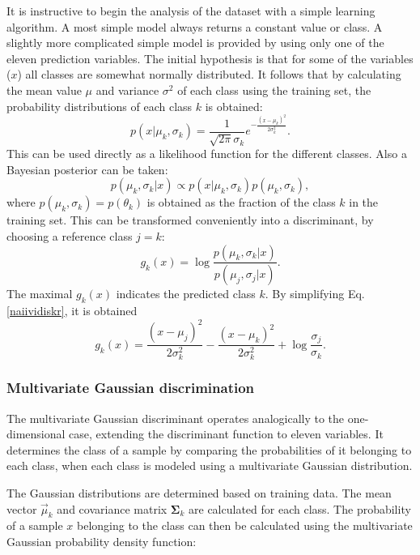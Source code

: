 \documentclass[twoside]{article}
\renewcommand{\v}[1]{\vec{#1}}
\begin{document}
\begin{multicols}{2}
It is instructive to begin the analysis of the dataset with a simple
learning algorithm. A most simple model always returns a constant value or
class. A slightly more complicated simple model is provided by using only one of the eleven prediction variables. 
The initial hypothesis is that for some of the variables ($x$) all classes are somewhat
normally distributed. It follows that by calculating the mean value 
$\mu$ and variance $\sigma^2$ of each class using the training set, the probability distributions of 
each class $k$ is obtained:
\begin{equation}
 p(x|\mu_k,\sigma_k) = \frac{1}{\sqrt{2\pi} \sigma_k} e^{-\frac{(x-\mu_k)^2}{2\sigma_k^2}}.
\end{equation}
This can be used directly as a likelihood function for the different classes. Also a Bayesian posterior
can be taken:
\begin{equation}\label{posterior}
 p(\mu_k,\sigma_k|x) \propto p(x|\mu_k,\sigma_k) p(\mu_k,\sigma_k),
\end{equation}
where $p(\mu_k,\sigma_k) = p(\theta_k)$ is obtained as the fraction of the class $k$ in the 
training set. This can be transformed conveniently into a discriminant, by choosing a reference
class $j = k$:
\begin{equation}\label{naiividiskr}
 g_k(x) = \log \frac{p(\mu_k,\sigma_k|x)}{p(\mu_j,\sigma_j|x)}.
\end{equation}
The maximal $g_k(x)$ indicates the predicted class $k$. By simplifying Eq. \eqref{naiividiskr},
it is obtained
\begin{equation}\label{naiividiskr2}
 g_k(x) = \frac{(x-\mu_j)^2}{2\sigma_k^2}-\frac{(x-\mu_k)^2}{2\sigma_k^2} + 
 \log \frac{\sigma_j}{\sigma_k}.
\end{equation}

\subsubsection{Multivariate Gaussian discrimination}\label{method:multig}

The multivariate Gaussian discriminant operates analogically to the one-dimensional
case, extending the discriminant function to eleven variables. It determines the class of a sample by
comparing the probabilities of it belonging to each class, when each
class is modeled using a multivariate Gaussian distribution.

The Gaussian distributions are determined based on training data.
The mean vector $\v{\mu}_k$ and covariance matrix $\mathbf{\Sigma}_k$ are calculated for each class.
The probability of a sample $x$ belonging to the class can then be calculated
using the multivariate Gaussian probability density function:


\end{multicols}
\end{document}
